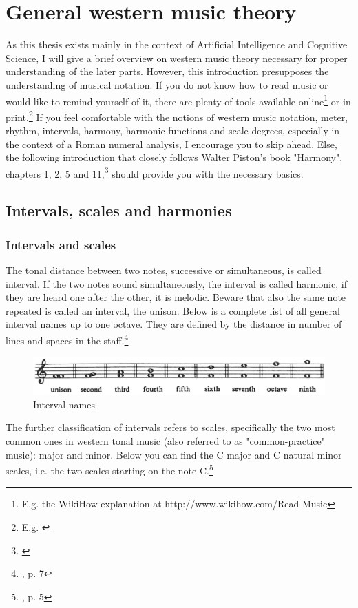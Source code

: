 \documentclass[a4paper,12pt]{report}
\begin{document}
\section{General western music theory}
As this thesis exists mainly in the context of Artificial Intelligence and Cognitive Science, I will give a brief overview on western music theory necessary for proper understanding of the later parts. However, this introduction presupposes the understanding of musical notation. If you do not know how to read music or would like to remind yourself of it, there are plenty of tools available online\footnote{E.g. the WikiHow explanation at http://www.wikihow.com/Read-Music} or in print.\footnote{E.g. \cite{cooper1982read}} If you feel comfortable with the notions of western music notation, meter, rhythm, intervals, harmony, harmonic functions and scale degrees, especially in the context of a Roman numeral analysis, I encourage you to skip ahead. Else, the following introduction that closely follows Walter Piston's book "Harmony", chapters 1, 2, 5 and 11,\footnote{\cite{piston1987harmony}} should provide you with the necessary basics.

\subsection{Intervals, scales and harmonies}
\subsubsection{Intervals and scales}
The tonal distance between two notes, successive or simultaneous, is called interval. If the two notes sound simultaneously, the interval is called harmonic, if they are heard one after the other, it is melodic. Beware that also the same note repeated is called an interval, the unison. Below is a complete list of all general interval names up to one octave. They are defined by the distance in number of lines and spaces in the staff.\footnote{\cite{piston1987harmony}, p. 7}

\begin{figure}[h]
\centering
\includegraphics[scale=0.32]{Piston_1.jpg}
\caption{Interval names}
\end{figure}

The further classification of intervals refers to scales, specifically the two most common ones in western tonal music (also referred to as "common-practice" music): major and minor. Below you can find the C major and C natural minor scales, i.e. the two scales starting on the note C.\footnote{\cite{piston1987harmony}, p. 5}
\end{document}
